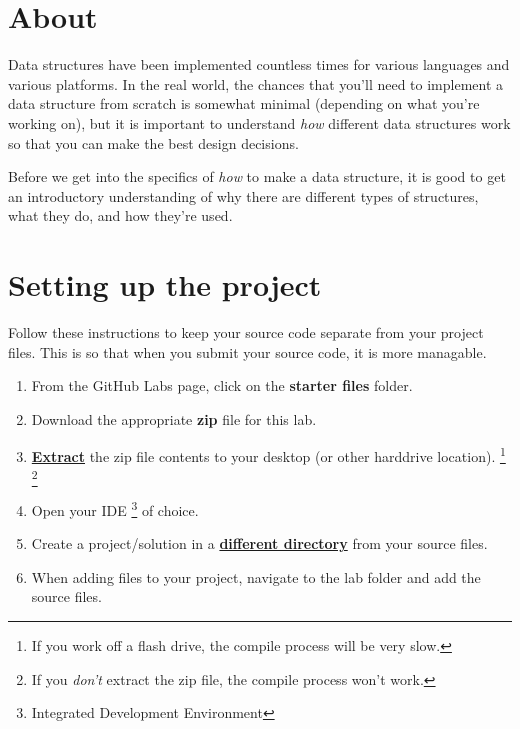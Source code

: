
\newcommand{\laClass}       {CS 250}
\newcommand{\laSemester}    {Spring 2018}
\newcommand{\laChapter}     {}
\newcommand{\laType}        {Lab}
\newcommand{\laAssignment}  {}
\newcommand{\laPoints}      {5}
\newcommand{\laTitle}       {The Standard Template Library}
\newcommand{\laStarterFiles}{Download from GitHub.}
\newcommand{\laTopics}      {Vectors, Lists, Stack, Queue, Map}
\setcounter{chapter}{1}
\setcounter{section}{1}
\addtocounter{section}{-1}
\toggletrue{answerkey}
\togglefalse{answerkey}




    \section{About}

    Data structures have been implemented countless times for various languages and various platforms.
    In the real world, the chances that you'll need to implement a data structure from scratch
    is somewhat minimal (depending on what you're working on), but it is important to understand
    \textit{how} different data structures work so that you can make the best design decisions.

    Before we get into the specifics of \textit{how} to make a data structure,
    it is good to get an introductory understanding of why there are different types of structures,
    what they do, and how they're used.

    \section{Setting up the project}

    Follow these instructions to keep your source code separate from your project files.
    This is so that when you submit your source code, it is more managable.

    \begin{enumerate}
        \item   From the GitHub Labs page, click on the \textbf{starter files} folder.
        \item   Download the appropriate \textbf{zip} file for this lab.
        \item   \textbf{ \underline{Extract} } the zip file contents to your desktop (or other harddrive location).
                \footnote{If you work off a flash drive, the compile process will be very slow.}
                \footnote{If you \textit{don't} extract the zip file, the compile process won't work.}
        \item   Open your IDE \footnote{Integrated Development Environment} of choice.
        \item   Create a project/solution in a \textbf{\underline{different directory}} from your source files.
        \item   When adding files to your project, navigate to the lab folder and add the source files.
    \end{enumerate}

